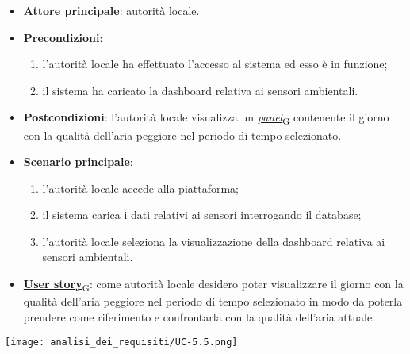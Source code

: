 \begin{itemize}
	\item \textbf{Attore principale}: autorità locale.
	\item \textbf{Precondizioni}:
	      \begin{enumerate}
		      \item l'autorità locale ha effettuato l'accesso al sistema ed esso è in funzione;
		      \item il sistema ha caricato la dashboard relativa ai sensori ambientali.
	      \end{enumerate}
	\item \textbf{Postcondizioni}: l'autorità locale visualizza un \href{https://7last.github.io/docs/rtb/documentazione-interna/glossario\#panel}{\textit{panel}\textsubscript{G}} contenente il giorno con la qualità dell'aria peggiore nel periodo di tempo selezionato.
	\item \textbf{Scenario principale}:
	      \begin{enumerate}
		      \item l'autorità locale accede alla piattaforma;
		      \item il sistema carica i dati relativi ai sensori interrogando il database;
		      \item l'autorità locale seleziona la visualizzazione della dashboard relativa ai sensori ambientali.
	      \end{enumerate}
	\item \href{https://7last.github.io/docs/rtb/documentazione-interna/glossario\#user-story}{\textbf{User story}\textsubscript{G}}:
	      come autorità locale desidero poter visualizzare il giorno con la qualità dell'aria peggiore nel periodo di tempo selezionato
	      in modo da poterla prendere come riferimento e confrontarla con la qualità dell'aria attuale.
\end{itemize}
\begin{center}
	\texttt{[image: analisi\_dei\_requisiti/UC-5.5.png]}
\end{center}


